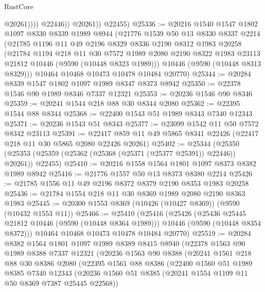 \begin{lexlean}{RustCore}
\begin{coremodule}
                      @20261))))
              @22446))
          @20261))
      @22455)
@25336 := @20216
    @1540
    @1547
    @1802
    @1097
    @8330
    @8339
    @1989
    @8944
    (@21776
      @1539
      @50
      @13
      @8330
      @8337
      @2214
      (@21785
        @1196
        @11
        @49
        @2196
        @8329
        @8336
        @2190
        @8312
        @1983
        @20258
        (@21784
          @1194
          @218
          @11
          @30
          @7572
          @1989
          @2080
          @2190
          @8322
          @1983
          @23113
          @21812
          @10446
          (@9590 (@10448 @8323 @1989)))
        @10446
        (@9590 (@10448 @8313 @8329)))
      @10464
      @10468
      @10473
      @10478
      @10484
      @20770)
@25344 := @20284 @8339 @1547 @1802 @1097 @1989 @8347 @8373 @8942
@25350 := @22378 @1546 @90 @1989 @8346 @7337 @12321
@25353 := @20236 @1546 @90 @8346
@25359 := @20241 @1544 @218 @88 @30 @8344 @2080
@25362 := @22395 @1544 @88 @8344
@25368 := @22400 @1543 @51 @1989 @8343 @7340 @12343
@25371 := @20236 @1543 @51 @8343
@25377 := @23099 @1542 @11 @50 @7572 @8342 @23113
@25391 := @22417 @859 @11 @49 @5865 @8341 @22426 (@22417 @218 @11 @30 @5865 @2080 @22426 @20261)
@25402 := @25344
    (@25350 (@25353 (@25359 (@25362 (@25368 (@25371 (@25377 @25391)) @22446)) @20261)) @22455)
@25410 := @20216 @1558 @1564 @1801 @1097 @8373 @8382 @1989 @8942
@25416 := @21776 @1557 @50 @13 @8373 @8380 @2214
@25426 := @21785 @1556 @11 @49 @2196 @8372 @8379 @2190 @8353 @1983 @20258
@25436 := @21784 @1554 @218 @11 @30 @8369 @1989 @2080 @2190 @8363 @1983
@25445 := @20300 @1553 @8369 (@10426 (@10427 @8369)) (@9590 (@10432 @1553 @11))
@25466 := @25410
    (@25416
      (@25426
        (@25436 @25445 @21812 @10446 (@9590 (@10448 @8364 @1989)))
        @10446
        (@9590 (@10448 @8354 @8372)))
      @10464
      @10468
      @10473
      @10478
      @10484
      @20770)
@25519 := @20284
    @8382
    @1564
    @1801
    @1097
    @1989
    @8389
    @8415
    @8940
    (@22378
      @1563
      @90
      @1989
      @8388
      @7337
      @12321
      (@20236
        @1563
        @90
        @8388
        (@20241
          @1561
          @218
          @88
          @30
          @8386
          @2080
          (@22395
            @1561
            @88
            @8386
            (@22400
              @1560
              @51
              @1989
              @8385
              @7340
              @12343
              (@20236 @1560 @51 @8385 (@20241 @1554 @1109 @11 @50 @8369 @7387 @25445 @22568))

\end{coremodule}
\end{lexlean}
